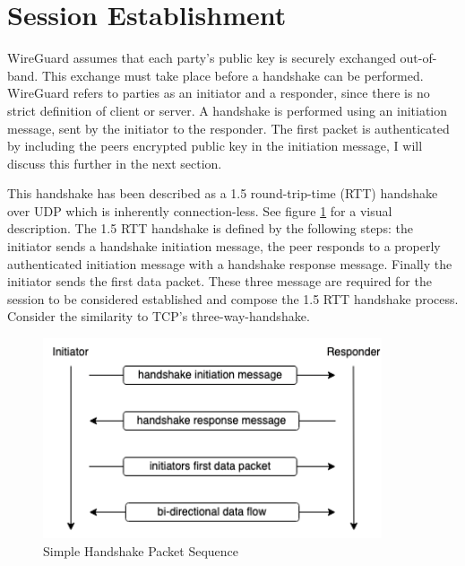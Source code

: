 \documentclass [11pt, proquest] {uwthesis}[2020/02/24]
\begin{document}
\section {Session Establishment}
\label{session_establish}
WireGuard assumes that each party's public key is securely exchanged out-of-band. This exchange must take place before a handshake can be performed. 
WireGuard refers to parties as an initiator and a responder, since there is no strict definition of client or server. A handshake is performed using an initiation message, sent by the initiator to the responder. The first packet is authenticated by including the peers encrypted public key in the initiation message, I will discuss this further in the next section.

This handshake has been described as a 1.5 round-trip-time (RTT) handshake over UDP which is inherently connection-less. See figure \ref{fig:simpleHandSeq} for a visual description. The 1.5 RTT handshake is defined by the following steps: the initiator sends a handshake initiation message, the peer responds to a properly authenticated initiation message with a handshake response message. Finally the initiator sends the first data packet. These three message are required for the session to be considered established and compose the 1.5 RTT handshake process. Consider the similarity to TCP's three-way-handshake.

\begin{figure}[ht]
\begin{center}
\includegraphics[width=10cm]{paper/images/handshake_process.png}
\caption{Simple Handshake Packet Sequence}
\label{fig:simpleHandSeq}
\end{center}
\end{figure}
\end{document}
